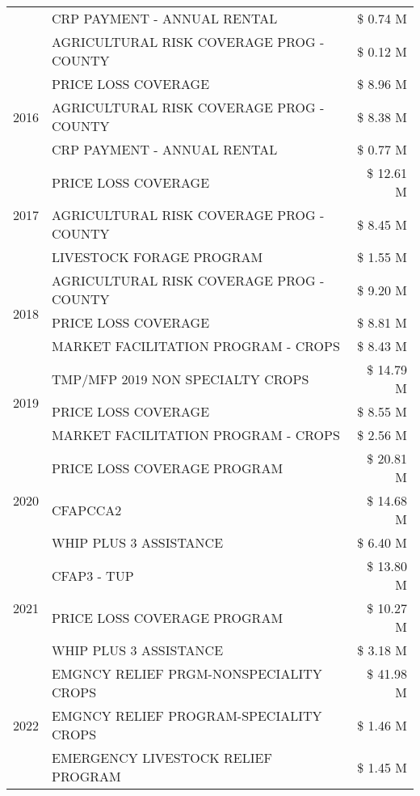 \begin{tabular}{llr}
 & CRP PAYMENT - ANNUAL RENTAL & \$ 0.74 M \\
 & AGRICULTURAL RISK COVERAGE PROG - COUNTY & \$ 0.12 M \\
\cline{1-3}
\multirow[t]{3}{*}{2016} & PRICE LOSS COVERAGE & \$ 8.96 M \\
 & AGRICULTURAL RISK COVERAGE PROG - COUNTY & \$ 8.38 M \\
 & CRP PAYMENT - ANNUAL RENTAL & \$ 0.77 M \\
\cline{1-3}
\multirow[t]{3}{*}{2017} & PRICE LOSS COVERAGE & \$ 12.61 M \\
 & AGRICULTURAL RISK COVERAGE PROG - COUNTY & \$ 8.45 M \\
 & LIVESTOCK FORAGE PROGRAM & \$ 1.55 M \\
\cline{1-3}
\multirow[t]{3}{*}{2018} & AGRICULTURAL RISK COVERAGE PROG - COUNTY & \$ 9.20 M \\
 & PRICE LOSS COVERAGE & \$ 8.81 M \\
 & MARKET FACILITATION PROGRAM - CROPS & \$ 8.43 M \\
\cline{1-3}
\multirow[t]{3}{*}{2019} & TMP/MFP 2019 NON SPECIALTY CROPS & \$ 14.79 M \\
 & PRICE LOSS COVERAGE & \$ 8.55 M \\
 & MARKET FACILITATION PROGRAM - CROPS & \$ 2.56 M \\
\cline{1-3}
\multirow[t]{3}{*}{2020} & PRICE LOSS COVERAGE PROGRAM & \$ 20.81 M \\
 & CFAPCCA2 & \$ 14.68 M \\
 & WHIP PLUS 3 ASSISTANCE & \$ 6.40 M \\
\cline{1-3}
\multirow[t]{3}{*}{2021} & CFAP3 - TUP & \$ 13.80 M \\
 & PRICE LOSS COVERAGE PROGRAM & \$ 10.27 M \\
 & WHIP PLUS 3 ASSISTANCE & \$ 3.18 M \\
\cline{1-3}
\multirow[t]{3}{*}{2022} & EMGNCY RELIEF PRGM-NONSPECIALITY CROPS & \$ 41.98 M \\
 & EMGNCY RELIEF PROGRAM-SPECIALITY CROPS & \$ 1.46 M \\
 & EMERGENCY LIVESTOCK RELIEF PROGRAM & \$ 1.45 M \\
\cline{1-3}
\bottomrule
\end{tabular}
